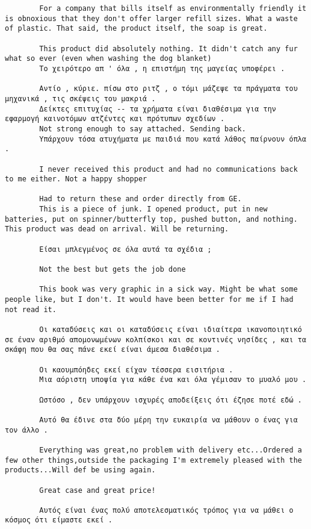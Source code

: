 \documentclass[11pt, a4paper]{article}
\begin{document}
\begin{verbatim}
		For a company that bills itself as environmentally friendly it is obnoxious that they don't offer larger refill sizes. What a waste of plastic. That said, the product itself, the soap is great.
		
		This product did absolutely nothing. It didn't catch any fur what so ever (even when washing the dog blanket)
		Το χειρότερο απ ' όλα , η επιστήμη της μαγείας υποφέρει .
		
		Αντίο , κύριε. πίσω στο ριτζ , ο τόμι μάζεψε τα πράγματα του μηχανικά , τις σκέψεις του μακριά .
		Δείκτες επιτυχίας -- τα χρήματα είναι διαθέσιμα για την εφαρμογή καινοτόμων ατζέντες και πρότυπων σχεδίων .
		Not strong enough to say attached. Sending back.
		Υπάρχουν τόσα ατυχήματα με παιδιά που κατά λάθος παίρνουν όπλα .
		
		I never received this product and had no communications back to me either. Not a happy shopper
		
		Had to return these and order directly from GE.
		This is a piece of junk. I opened product, put in new batteries, put on spinner/butterfly top, pushed button, and nothing. This product was dead on arrival. Will be returning.
		
		Είσαι μπλεγμένος σε όλα αυτά τα σχέδια ;
		
		Not the best but gets the job done
		
		This book was very graphic in a sick way. Might be what some people like, but I don't. It would have been better for me if I had not read it.
		
		Οι καταδύσεις και οι καταδύσεις είναι ιδιαίτερα ικανοποιητικό σε έναν αριθμό απομονωμένων κολπίσκοι και σε κοντινές νησίδες , και τα σκάφη που θα σας πάνε εκεί είναι άμεσα διαθέσιμα .
		
		Οι καουμπόηδες εκεί είχαν τέσσερα εισιτήρια .
		Μια αόριστη υποψία για κάθε ένα και όλα γέμισαν το μυαλό μου .
		
		Ωστόσο , δεν υπάρχουν ισχυρές αποδείξεις ότι έζησε ποτέ εδώ .
		
		Αυτό θα έδινε στα δύο μέρη την ευκαιρία να μάθουν ο ένας για τον άλλο .
		
		Everything was great,no problem with delivery etc...Ordered a few other things,outside the packaging I'm extremely pleased with the products...Will def be using again.
		
		Great case and great price!
		
		Αυτός είναι ένας πολύ αποτελεσματικός τρόπος για να μάθει ο κόσμος ότι είμαστε εκεί .
	\end{verbatim}
	
\end{document}

